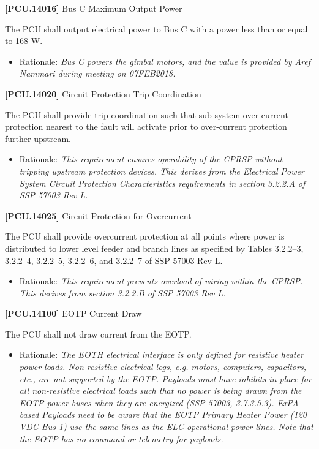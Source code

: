 \documentclass[12pt,oneside,oldfontcommands]{memoir}
\begin{document}
\textbf{[PCU.14016]} Bus C Maximum Output Power

The \gls{PCU} shall output electrical power to Bus C with a power less than or equal to 168 W.

\begin{itemize}
\item{} Rationale: \emph{Bus C powers the gimbal motors, and the value is provided by Aref Nammari during meeting on 07FEB2018.}

\end{itemize}

\textbf{[PCU.14020]} Circuit Protection Trip Coordination

The \gls{PCU} shall provide trip coordination such that sub-system over-current protection nearest to the fault will activate prior to over-current protection further upstream.

\begin{itemize}
\item{} Rationale: \emph{This requirement ensures operability of the CPRSP without tripping upstream protection devices. This derives from the Electrical Power System Circuit Protection Characteristics requirements in section 3.2.2.A of SSP 57003 Rev L.}

\end{itemize}

\textbf{[PCU.14025]} Circuit Protection for Overcurrent

The \gls{PCU} shall provide overcurrent protection at all points where power is distributed to lower level feeder and branch lines as specified by Tables 3.2.2--3, 3.2.2--4, 3.2.2--5, 3.2.2--6, and 3.2.2--7 of SSP 57003 Rev L.

\begin{itemize}
\item{} Rationale: \emph{This requirement prevents overload of wiring within the CPRSP. This derives from section 3.2.2.B of SSP 57003 Rev L.}

\end{itemize}

\textbf{[PCU.14100]} \gls{EOTP} Current Draw

The \gls{PCU} shall not draw current from the \gls{EOTP}.

\begin{itemize}
\item{} Rationale: \emph{The EOTH electrical interface is only defined for resistive heater power loads. Non-resistive electrical logs, \emph{e.g.} motors, computers, capacitors, \emph{etc.}, are not supported by the EOTP. Payloads must have inhibits in place for all non-resistive electrical loads such that no power is being drawn from the EOTP power buses when they are energized (SSP 57003, 3.7.3.5.3). ExPA-based Payloads need to be aware that the EOTP Primary Heater Power (120 VDC Bus 1) use the same lines as the ELC operational power lines. Note that the EOTP has no command or telemetry for payloads.}

\end{itemize}
\end{document}
